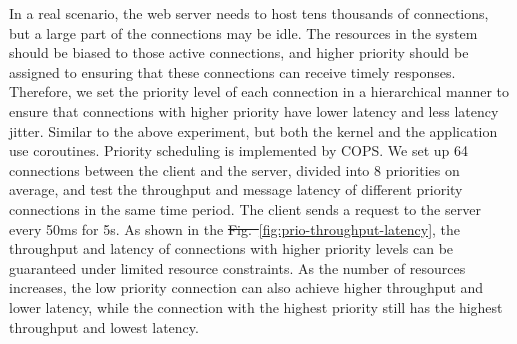 \documentclass[sigconf,review,anonymous]{acmart}
\providecommand{\DIFadd}[1]{{\protect\color{blue}\uwave{#1}}} %
\providecommand{\DIFdel}[1]{{\protect\color{red}\sout{#1}}}                      %
\providecommand{\DIFaddbegin}{} %
\providecommand{\DIFaddend}{} %
\providecommand{\DIFdelbegin}{} %
\providecommand{\DIFdelend}{} %
\begin{document}
In a real scenario, the web server needs to host tens thousands of connections, but a large part of the connections may be idle. The resources in the system should be biased to those active connections, and higher priority should be assigned to ensuring that these connections can receive timely responses. Therefore, we set the priority level of each connection in a hierarchical manner to ensure that connections with higher priority have lower latency and less latency jitter. Similar to the above experiment, but both the kernel and the application use coroutines. Priority scheduling is implemented by COPS. We set up 64 connections between the client and the server, divided into 8 priorities on average, and test the throughput and message latency of different priority connections in the same time period. The client sends a request to the server every 50ms for 5s. As shown in the \DIFdelbegin \DIFdel{Fig.~}\DIFdelend \DIFaddbegin \DIFadd{Figure }\DIFaddend \ref{fig:prio-throughput-latency}, the throughput and latency of connections with higher priority levels can be guaranteed under limited resource constraints. As the number of resources increases, the low priority connection can also achieve higher throughput and lower latency, while the connection with the highest priority still has the highest throughput and lowest latency.
\end{document}
